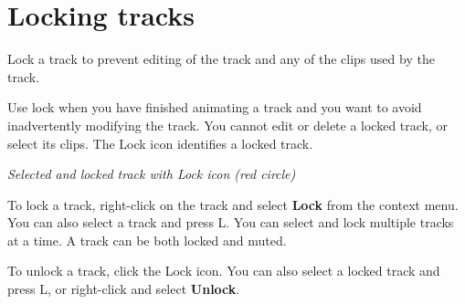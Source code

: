 \chapter{Locking tracks}
\hypertarget{md__hey_tea_9_2_library_2_package_cache_2com_8unity_8timeline_0d1_87_85_2_documentation_0i_2trk__lock}{}\label{md__hey_tea_9_2_library_2_package_cache_2com_8unity_8timeline_0d1_87_85_2_documentation_0i_2trk__lock}
\label{md__hey_tea_9_2_library_2_package_cache_2com_8unity_8timeline_0d1_87_85_2_documentation_0i_2trk__lock_autotoc_md4760}%
%
 Lock a track to prevent editing of the track and any of the clips used by the track.

Use lock when you have finished animating a track and you want to avoid inadvertently modifying the track. You cannot edit or delete a locked track, or select its clips. The Lock icon identifies a locked track.



{\itshape Selected and locked track with Lock icon (red circle)}

To lock a track, right-\/click on the track and select {\bfseries{Lock}} from the context menu. You can also select a track and press L. You can select and lock multiple tracks at a time. A track can be both locked and muted.

To unlock a track, click the Lock icon. You can also select a locked track and press L, or right-\/click and select {\bfseries{Unlock}}. 